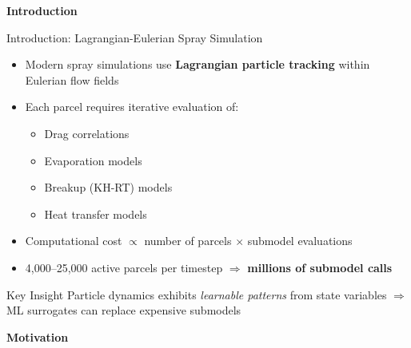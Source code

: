 \documentclass[aspectratio=169]{beamer}
\begin{document}
\begin{frame}{}
\vfill
\begin{center}
{\Huge\textbf{Introduction}}
\end{center}
\vfill
\end{frame}

\begin{frame}{Introduction: Lagrangian-Eulerian Spray Simulation}
\begin{itemize}[<+->]
    \item Modern spray simulations use \textbf{Lagrangian particle tracking} within Eulerian flow fields
    \item Each parcel requires iterative evaluation of:
    \begin{itemize}
        \item Drag correlations
        \item Evaporation models  
        \item Breakup (KH-RT) models
        \item Heat transfer models
    \end{itemize}
    \item Computational cost $\propto$ number of parcels $\times$ submodel evaluations
    \item 4,000--25,000 active parcels per timestep $\Rightarrow$ \textbf{millions of submodel calls}
\end{itemize}

\vspace{0.2cm}
\pause
\begin{alertblock}{Key Insight}
Particle dynamics exhibits \textit{learnable patterns} from state variables $\Rightarrow$ ML surrogates can replace expensive submodels
\end{alertblock}
\end{frame}

\begin{frame}{}
\vfill
\begin{center}
{\Huge\textbf{Motivation}}
\end{center}
\vfill
\end{frame}
\end{document}
